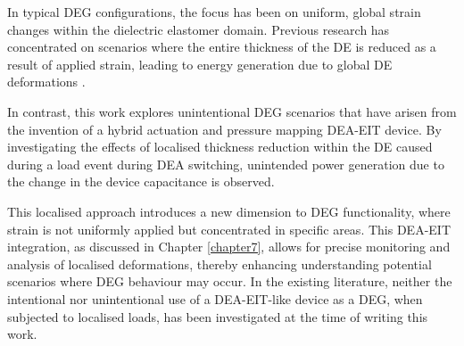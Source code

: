 In typical DEG configurations, the focus has been on uniform, global strain changes within the dielectric elastomer domain. Previous research has concentrated on scenarios where the entire thickness of the DE is reduced as a result of applied strain, leading to energy generation due to global DE deformations \cite{Carpi2015, Savage2012, Koh2009}.

In contrast, this work explores unintentional DEG scenarios that have arisen from the invention of a hybrid actuation and pressure mapping DEA-EIT device. By investigating the effects of localised thickness reduction within the DE caused during a load event during DEA switching, unintended power generation due to the change in the device capacitance is observed.

This localised approach introduces a new dimension to DEG functionality, where strain is not uniformly applied but concentrated in specific areas. This DEA-EIT integration, as discussed in Chapter \ref{chapter7}, allows for precise monitoring and analysis of localised deformations, thereby enhancing understanding potential scenarios where DEG behaviour may occur. In the existing literature, neither the intentional nor unintentional use of a DEA-EIT-like device as a DEG, when subjected to localised loads, has been investigated at the time of writing this work.



